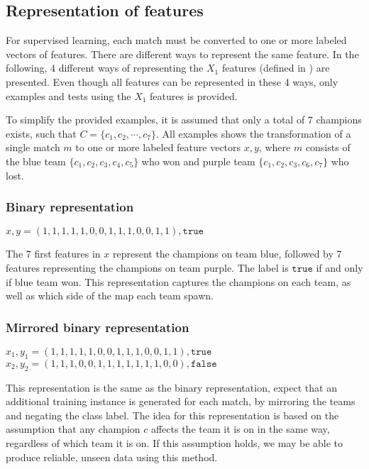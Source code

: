 
\subsection{Representation of features}
\label{sec:representationoffeatures}
For supervised learning, each match must be converted to one or more labeled vectors of features.
There are different ways to represent the same feature. In the following,
4 different ways of representing the $X_1$ features (defined in ) are presented.
Even though all features can be represented in these 4 ways, only examples and tests using the $X_1$ features is provided.

To simplify the provided examples, it is assumed that only a total of 7 champions exists, such that $C = \{c_1, c_2, \cdots, c_7\}$.
All examples shows the transformation of a single match $m$ to one or more labeled feature vectors $x, y$, where $m$ consists of the blue team $\{c_1,c_2,c_3,c_4,c_5\}$ who won and purple team $\{c_1,c_2,c_3,c_6,c_7\}$ who lost.

\subsubsection{Binary representation}
\begin{center}
$x, y = (1,1,1,1,1,0,0,1,1,1,0,0,1,1), \texttt{true}$
\end{center}
The 7 first features in $x$ represent the champions on team blue, followed by 7 features representing the champions on team purple.
The label is $\texttt{true}$ if and only if blue team won.
This representation captures the champions on each team, as well as which side of the map each team spawn.

\subsubsection{Mirrored binary representation}
\begin{center}
$x_1, y_1 = (1,1,1,1,1,0,0,1,1,1,0,0,1,1), \texttt{true}$\\
$x_2, y_2 = (1,1,1,0,0,1,1,1,1,1,1,1,0,0), \texttt{false}$
\end{center}
This representation is the same as the binary representation, expect that an additional training instance is generated for each match, by mirroring the teams and negating the class label.
The idea for this representation is based on the assumption that any champion $c$ affects the team it is on in the same way, regardless of which team it is on.
If this assumption holds, we may be able to produce reliable, unseen data using this method.

